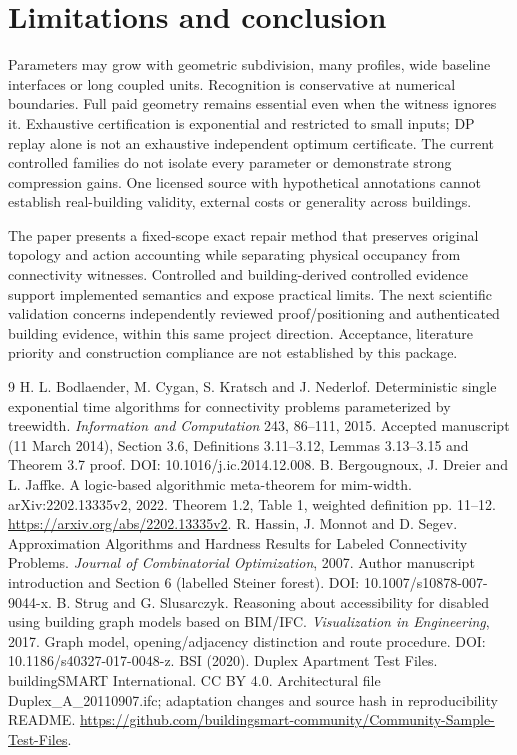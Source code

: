 \documentclass[10pt]{article}
\begin{document}
\section{Limitations and conclusion}
Parameters may grow with geometric subdivision, many profiles, wide baseline interfaces or long coupled units. Recognition is conservative at numerical boundaries. Full paid geometry remains essential even when the witness ignores it. Exhaustive certification is exponential and restricted to small inputs; DP replay alone is not an exhaustive independent optimum certificate. The current controlled families do not isolate every parameter or demonstrate strong compression gains. One licensed source with hypothetical annotations cannot establish real-building validity, external costs or generality across buildings.

The paper presents a fixed-scope exact repair method that preserves original topology and action accounting while separating physical occupancy from connectivity witnesses. Controlled and building-derived controlled evidence support implemented semantics and expose practical limits. The next scientific validation concerns independently reviewed proof/positioning and authenticated building evidence, within this same project direction. Acceptance, literature priority and construction compliance are not established by this package.

\begin{thebibliography}{9}
 H. L. Bodlaender, M. Cygan, S. Kratsch and J. Nederlof. Deterministic single exponential time algorithms for connectivity problems parameterized by treewidth. \emph{Information and Computation} 243, 86--111, 2015. Accepted manuscript (11 March 2014), Section 3.6, Definitions 3.11--3.12, Lemmas 3.13--3.15 and Theorem 3.7 proof. DOI: 10.1016/j.ic.2014.12.008.
 B. Bergougnoux, J. Dreier and L. Jaffke. A logic-based algorithmic meta-theorem for mim-width. arXiv:2202.13335v2, 2022. Theorem 1.2, Table 1, weighted definition pp. 11--12. \url{https://arxiv.org/abs/2202.13335v2}.
 R. Hassin, J. Monnot and D. Segev. Approximation Algorithms and Hardness Results for Labeled Connectivity Problems. \emph{Journal of Combinatorial Optimization}, 2007. Author manuscript introduction and Section 6 (labelled Steiner forest). DOI: 10.1007/s10878-007-9044-x.
 B. Strug and G. Slusarczyk. Reasoning about accessibility for disabled using building graph models based on BIM/IFC. \emph{Visualization in Engineering}, 2017. Graph model, opening/adjacency distinction and route procedure. DOI: 10.1186/s40327-017-0048-z.
 BSI (2020). Duplex Apartment Test Files. buildingSMART International. CC BY 4.0. Architectural file Duplex\_A\_20110907.ifc; adaptation changes and source hash in reproducibility README. \url{https://github.com/buildingsmart-community/Community-Sample-Test-Files}.
\end{thebibliography}
\end{document}
